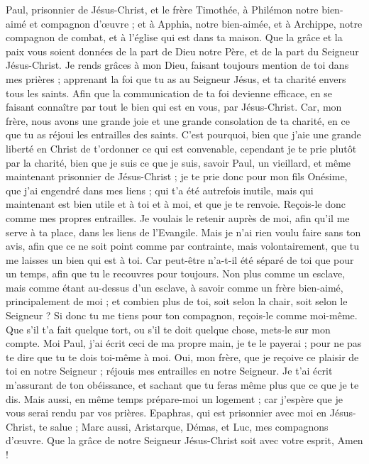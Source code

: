 \begin{multicols}{2}
\VerseOne{}Paul, prisonnier de Jésus-Christ, et le frère Timothée, à Philémon notre bien-aimé et compagnon d'œuvre ;
et à Apphia, notre bien-aimée, et à Archippe, notre compagnon de combat, et à l'église qui est dans ta maison.
Que la grâce et la paix vous soient données de la part de Dieu notre Père, et de la part du Seigneur Jésus-Christ.
Je rends grâces à mon Dieu, faisant toujours mention de toi dans mes prières ;
apprenant la foi que tu as au Seigneur Jésus, et ta charité envers tous les saints.
Afin que la communication de ta foi devienne efficace, en se faisant connaître par tout le bien qui est en vous, par Jésus-Christ.
Car, mon frère, nous avons une grande joie et une grande consolation de ta charité, en ce que tu as réjoui les entrailles des saints.
C'est pourquoi, bien que j'aie une grande liberté en Christ de t’ordonner ce qui est convenable,
cependant je te prie plutôt par la charité, bien que je suis ce que je suis, savoir Paul, un vieillard, et même maintenant prisonnier de Jésus-Christ ;
je te prie donc pour mon fils Onésime, que j'ai engendré dans mes liens ;
qui t'a été autrefois inutile, mais qui maintenant est bien utile et à toi et à moi, et que je te renvoie.
Reçois-le donc comme mes propres entrailles.
Je voulais le retenir auprès de moi, afin qu'il me serve à ta place, dans les liens de l'Evangile.
Mais je n'ai rien voulu faire sans ton avis, afin que ce ne soit point comme par contrainte, mais volontairement, que tu me laisses un bien qui est à toi.
Car peut-être n'a-t-il été séparé de toi que pour un temps, afin que tu le recouvres pour toujours.
Non plus comme un esclave, mais comme étant au-dessus d'un esclave, à savoir comme un frère bien-aimé, principalement de moi ; et combien plus de toi, soit selon la chair, soit selon le Seigneur ?
Si donc tu me tiens pour ton compagnon, reçois-le comme moi-même.
Que s'il t'a fait quelque tort, ou s'il te doit quelque chose, mets-le sur mon compte.
Moi Paul, j'ai écrit ceci de ma propre main, je te le payerai ; pour ne pas te dire que tu te dois toi-même à moi.
Oui, mon frère, que je reçoive ce plaisir de toi en notre Seigneur ; réjouis mes entrailles en notre Seigneur.
Je t'ai écrit m'assurant de ton obéissance, et sachant que tu feras même plus que ce que je te dis.
Mais aussi, en même temps prépare-moi un logement ; car j'espère que je vous serai rendu par vos prières.
Epaphras, qui est prisonnier avec moi en Jésus-Christ, te salue ;
Marc aussi, Aristarque, Démas, et Luc, mes compagnons d'œuvre.
Que la grâce de notre Seigneur Jésus-Christ soit avec votre esprit, Amen !
\PPE{}
\end{multicols}
